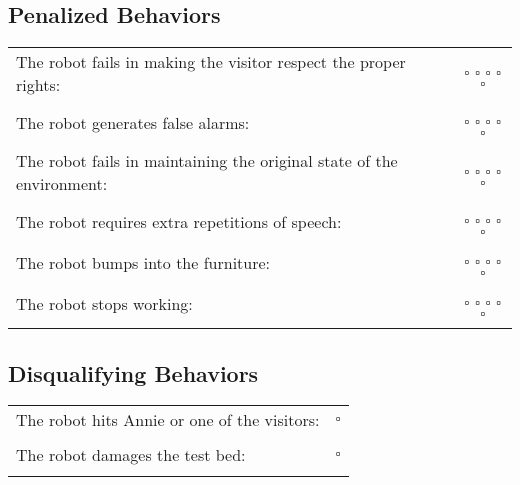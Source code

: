 \subsection*{Penalized Behaviors}
\begin{tabular}{ l c}
The robot fails in making the visitor respect the proper rights: & $\square$ $\square$ $\square$ $\square$ $\square$ \\ \\
The robot generates false alarms: & $\square$ $\square$ $\square$ $\square$ $\square$ \\ \\
The robot fails in maintaining the original state of the environment: & $\square$ $\square$ $\square$ $\square$ $\square$ \\ \\
The robot requires extra repetitions of speech: & $\square$ $\square$ $\square$ $\square$ $\square$ \\ \\
The robot bumps into the furniture: & $\square$ $\square$ $\square$ $\square$ $\square$ \\ \\
The robot stops working: & $\square$ $\square$ $\square$ $\square$ $\square$ \\ \\
\end{tabular}

\subsection*{Disqualifying Behaviors}
\begin{tabular}{ l c}
The robot hits Annie or one of the visitors: & $\square$ \\ \\
The robot damages the test bed: & $\square$ \\ \\
\end{tabular}

